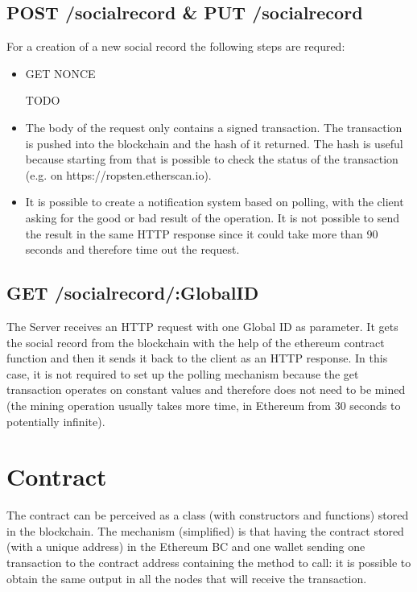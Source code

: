 \subsection{POST /socialrecord \& PUT /socialrecord}
  For a creation of a new social record the following steps are requred:
  \begin{itemize}
    \item GET NONCE \begin{notation}
      TODO
  \end{notation}
    \item The body of the request only contains a signed transaction. The transaction is pushed into the blockchain and the hash of it returned. The hash is useful because starting from that is possible to check the status of the transaction (e.g. on https://ropsten.etherscan.io).
    \item It is possible to create a notification system based on polling, with the client asking for the good or bad result of the operation. It is not possible to send the result in the same HTTP response since it could take more than 90 seconds and therefore time out the request.
  \end{itemize}
  
\subsection{GET /socialrecord/:GlobalID}
The Server receives an HTTP request with one Global ID as parameter. It gets the social record from the blockchain with the help of the ethereum contract function and then it sends it back to the client as an HTTP response.
In this case, it is not required to set up the polling mechanism because the get transaction operates on constant values and therefore does not need to be mined (the mining operation usually takes more time, in Ethereum from 30 seconds to potentially infinite).

\section{Contract}
The contract can be perceived as a class (with constructors and functions) stored in the blockchain.
The mechanism (simplified) is that having the contract stored (with a unique address) in the Ethereum BC and one wallet sending one transaction to the contract address containing the method to call: it is possible to obtain the same output in all the nodes that will receive the transaction.

